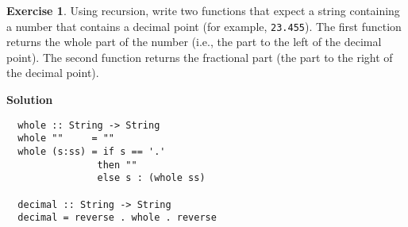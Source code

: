 \documentclass[11pt,a4paper]{article}
\theoremstyle{definition}
\newtheorem{exr}{Exercise}
\begin{document}
\begin{exr}
  Using recursion, write two functions that expect a string containing a number 
  that contains a decimal point (for example, \texttt{23.455}). The first function 
  returns the whole part of the number (i.e., the part to the left of the decimal 
  point). The second function returns the fractional part (the part to the right 
  of the decimal point).
\end{exr}

\textbf{Solution}
\begin{lstlisting}
  whole :: String -> String
  whole ""     = ""
  whole (s:ss) = if s == '.'
                then ""
                else s : (whole ss)

  decimal :: String -> String
  decimal = reverse . whole . reverse
\end{lstlisting}


  

  
\end{document}
